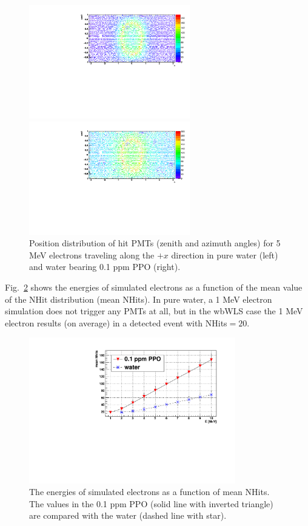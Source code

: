 \begin{figure}[htbp]
	\centering
	\begin{minipage}[t]{0.48\textwidth}
		\centering
		\includegraphics[width=7cm]{PMT_5MeVElectronWater.pdf}
	\end{minipage}
	\begin{minipage}[t]{0.48\textwidth}
		\centering
		\includegraphics[width=7cm]{PMT_5MeVElectron0p1ppmPPO.pdf}
	\end{minipage}
	\caption[Position distribution of hit PMTs (zenith and azimuth angles).]{Position distribution of hit PMTs (zenith and azimuth angles) for 5 MeV electrons traveling along the $+x$ direction in pure water (left) and water bearing 0.1 ppm PPO (right).}
	\label{pmt_wls}
\end{figure}

Fig.~\ref{nhit_wls} shows the energies of simulated electrons as a function of the mean value of the $\mathrm{NHit}$ distribution (mean NHits). In pure water, a 1 MeV electron simulation does not trigger any PMTs at all, but in the wbWLS case the 1 MeV electron results (on average) in a detected event with NHits$=20$.

\begin{figure}[htbp]
	\centering	
	\includegraphics[width=9cm]{nhits_wls.pdf}
	\caption[The energies of simulated electrons as a function of mean NHits.]{The energies of simulated electrons as a function of mean NHits. The values in the 0.1 ppm PPO (solid line with inverted triangle) are compared with the water (dashed line with star).}
	\label{nhit_wls}
\end{figure}

